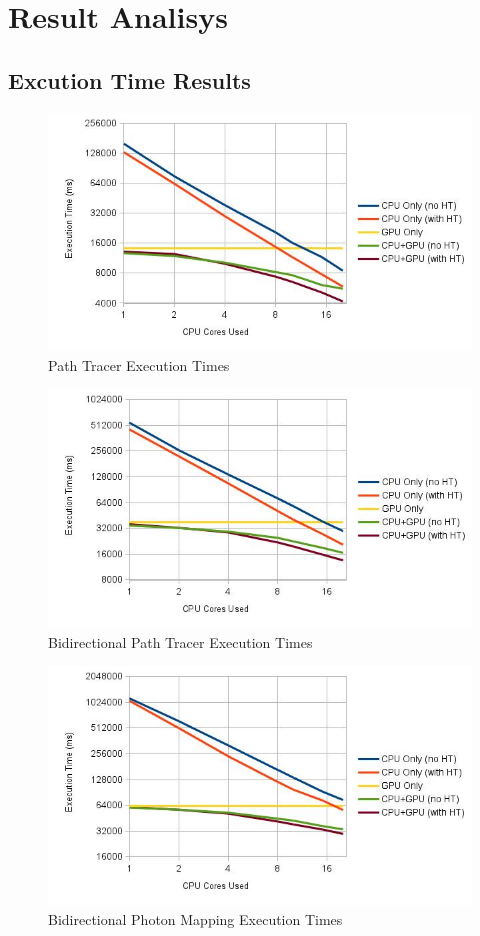 \section{Result Analisys}

\subsection{\label{sec:texec}Excution Time Results}

\begin{figure}[H]
\centering
\includegraphics[width=0.8\linewidth]{img/ptTexec.jpg}
\caption{\label{img:ptTexec} Path Tracer Execution Times}
\end{figure}

\begin{figure}[H]
\centering
\includegraphics[width=0.8\linewidth]{img/bptTexec.jpg}
\caption{\label{img:bptTexec} Bidirectional Path Tracer Execution Times}
\end{figure}

\begin{figure}[H]
\centering
\includegraphics[width=0.8\linewidth]{img/bpmTexec.jpg}
\caption{\label{img:bpmTexec} Bidirectional Photon Mapping Execution Times}
\end{figure}

